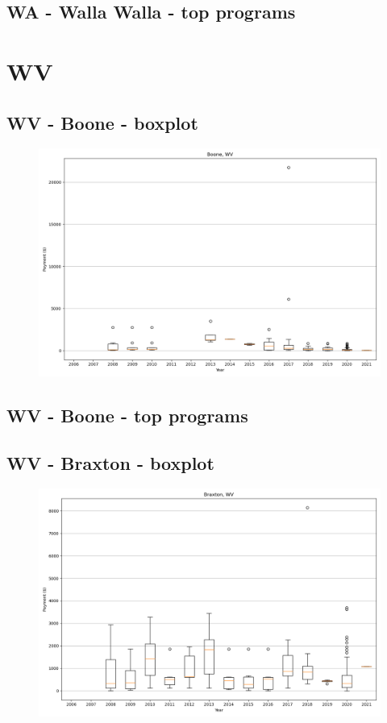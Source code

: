 \subsection*{WA - Walla Walla - top programs}

\newpage
\section*{WV}
\subsection*{WV - Boone - boxplot}
\begin{figure}[h]
\centering
\includegraphics[width=7in]{../output/boxplots/counties/Boone-WV_boxplot.png}
\end{figure}


\subsection*{WV - Boone - top programs}

\newpage
\subsection*{WV - Braxton - boxplot}
\begin{figure}[h]
\centering
\includegraphics[width=7in]{../output/boxplots/counties/Braxton-WV_boxplot.png}
\end{figure}


